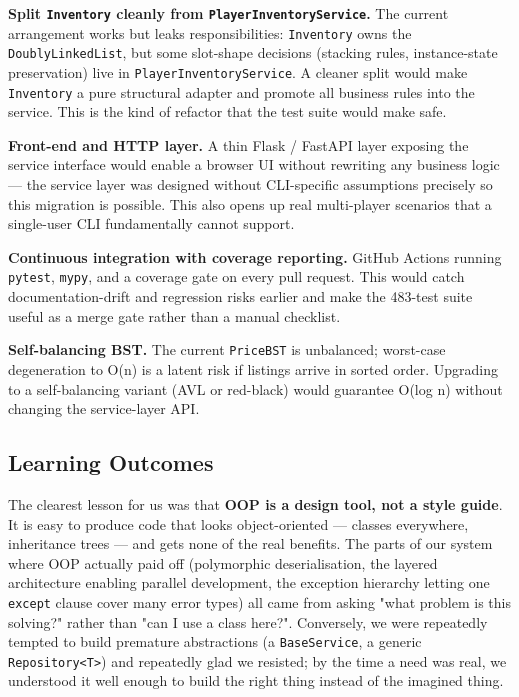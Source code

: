 \documentclass[11pt,a4paper]{article}
\begin{document}
\textbf{Split \texttt{Inventory} cleanly from \texttt{PlayerInventoryService}.}
The current arrangement works but leaks responsibilities: \texttt{Inventory} owns the \texttt{DoublyLinkedList}, but some slot-shape decisions (stacking rules, instance-state preservation) live in \texttt{PlayerInventoryService}. A cleaner split would make \texttt{Inventory} a pure structural adapter and promote all business rules into the service. This is the kind of refactor that the test suite would make safe.

\textbf{Front-end and HTTP layer.}
A thin Flask / FastAPI layer exposing the service interface would enable a browser UI without rewriting any business logic — the service layer was designed without CLI-specific assumptions precisely so this migration is possible. This also opens up real multi-player scenarios that a single-user CLI fundamentally cannot support.

\textbf{Continuous integration with coverage reporting.}
GitHub Actions running \texttt{pytest}, \texttt{mypy}, and a coverage gate on every pull request. This would catch documentation-drift and regression risks earlier and make the 483-test suite useful as a merge gate rather than a manual checklist.

\textbf{Self-balancing BST.}
The current \texttt{PriceBST} is unbalanced; worst-case degeneration to O(n) is a latent risk if listings arrive in sorted order. Upgrading to a self-balancing variant (AVL or red-black) would guarantee O(log n) without changing the service-layer API.


\subsection{Learning Outcomes}

The clearest lesson for us was that \textbf{OOP is a design tool, not a style guide}. It is easy to produce code that looks object-oriented — classes everywhere, inheritance trees — and gets none of the real benefits. The parts of our system where OOP actually paid off (polymorphic deserialisation, the layered architecture enabling parallel development, the exception hierarchy letting one \texttt{except} clause cover many error types) all came from asking "what problem is this solving?" rather than "can I use a class here?". Conversely, we were repeatedly tempted to build premature abstractions (a \texttt{BaseService}, a generic \texttt{Repository<T>}) and repeatedly glad we resisted; by the time a need was real, we understood it well enough to build the right thing instead of the imagined thing.
\end{document}
